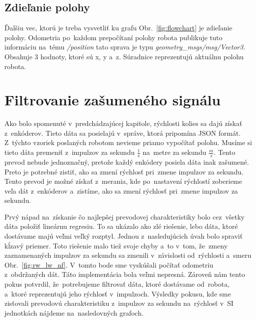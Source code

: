 \subsection{Zdieľanie polohy}
\label{sec:zdielanie_polohy}

Ďalšiu vec, ktorú je treba vysvetliť ku grafu Obr.~\ref{fig:flowchart} je zdieľanie polohy. Odometria po~každom prepočítaní polohy robota publikuje tuto
informáciu na~tému \textit{/position} tato sprava je typu \textit{geometry\_msgs/msg/Vector3}. Obsahuje 3 hodnoty, ktoré sú x, y a~z.
Súradnice reprezentujú aktuálnu polohu robota.

\section{Filtrovanie zašumeného signálu}
\label{sec:ziskavanieRychlosti}

Ako bolo spomenuté v~predchádzajúcej kapitole, rýchlosti kolies sa dajú získať z~enkóderov. Tieto dáta sa posielajú v~správe, ktorá pripomína JSON formát.
Z~týchto vzoriek poslaných robotom nevieme priamo vypočítať polohu. Musíme si tieto dáta premeniť z~impulzov za sekundu \(\frac{1}{s}\) na~metre
za sekundu \(\frac{m}{s}\). Tento prevod nebude jednoznačný, pretože každý enkódery posiela dáta inak zašumené. Preto je potrebné zistiť, ako sa zmení
rýchlosť pri~zmene impulzov za sekundu. Tento prevod je možné získať z~merania, kde po~nastavení rýchlostí zoberieme veľa dát z~enkóderov a~zistíme,
ako sa zmení rýchlosť pri~zmene impulzov za sekundu.

Prvý nápad na~získanie čo najlepšej prevodovej charakteristiky bolo cez~všetky dáta položiť lineárnu regresiu. To sa ukázalo ako zlé riešenie, lebo dáta,
ktoré dostávame majú veľmi veľký rozptyl. Jednou z~nasledujúcich úvah bolo spraviť kĺzavý priemer. Toto riešenie malo tiež svoje chyby a~to v~tom, že~zmeny
zaznamenaných impulzov za sekundu sa zmenili v~závislosti od~rýchlosti a~smeru Obr.~\ref{fig:rw_lw_nf}. V~tomto bode sme vyskúšali počítať odometriu
z~obdržaných dát. Táto implementácia bola veľmi nepresná. Zároveň nám tento pokus potvrdil, že~potrebujeme filtrovať dáta, ktoré dostávame
od~robota, a~ktoré reprezentujú jeho rýchlosť v~impulzoch. Výsledky pokusu, kde sme zisťovali prevodovú charakteristiku z~impulzov za sekundu na~rýchlosť
v~SI jednotkách nájdeme na~nasledovných grafoch.

